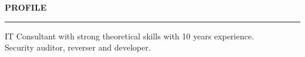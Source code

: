 \documentclass[10pt,A4]{article}
\newcommand{\mpwidth}{\linewidth-\fboxsep-\fboxsep}
\newcommand{\cvtext}[1] {
		\parbox{1\mpwidth}{#1}
}
\newcommand{\cvsection}[1] {
	\vspace{12pt}
	\cvtext{
		\textbf{\LARGE{\textcolor{darkcol}{\uppercase{#1}}}}\\[-4pt]
		\textcolor{maincol}{ \rule{0.1\textwidth}{2pt} } 
	}
}
\begin{document}
\begin{paracol}{2}
\begin{rightcolumn}
\vfill\null
\cvsection{PROFILE}
\newline
\newline
\newline
\cvtext{
	IT Consultant with strong theoretical skills with 10 years experience.\\
	Security auditor, reverser and developer.\newline
}

\vfill\null


\end{rightcolumn}
\end{paracol}
\end{document}
